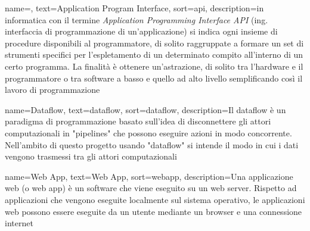 
\renewcommand{\acronymname}{Acronimi e abbreviazioni}



	
	



{
    name=,
    text=Application Program Interface,
    sort=api,
    description={in informatica con il termine \emph{Application Programming Interface API} (ing. interfaccia di programmazione di un'applicazione) si indica ogni insieme di procedure disponibili al programmatore, di solito raggruppate a formare un set di strumenti specifici per l'espletamento di un determinato compito all'interno di un certo programma. La finalità è ottenere un'astrazione, di solito tra l'hardware e il programmatore o tra software a basso e quello ad alto livello semplificando così il lavoro di programmazione}
}


{
    name=Dataflow,
    text=dataflow,
    sort=dataflow,
    description={Il dataflow è un paradigma di programmazione basato sull'idea di disconnettere gli attori computazionali in "pipelines" che possono eseguire azioni in modo concorrente. Nell'ambito di questo progetto usando "dataflow" si intende il modo in cui i dati vengono trasmessi tra gli attori computazionali}
}

{
	name=Web App,
	text=Web App,
	sort=webapp,
	description={Una applicazione web (o web app) è un software che viene eseguito su un web server. Rispetto ad applicazioni che vengono eseguite localmente sul sistema operativo, le applicazioni web possono essere eseguite da un utente mediante un browser e una connessione internet}
}

